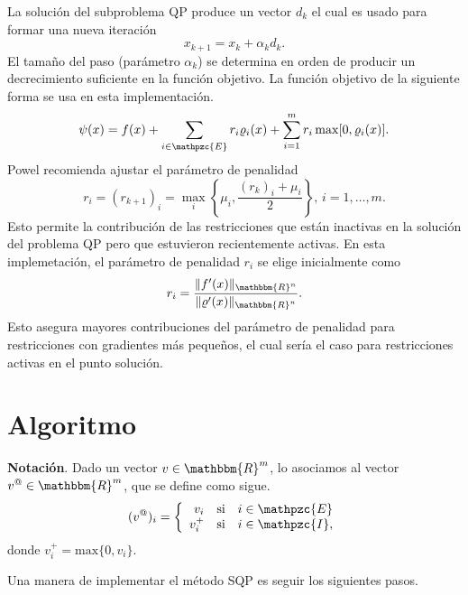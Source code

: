 \documentclass[a4paper,10pt]{book}
\newcommand{\R}{\mathbbm{R}}
\newcommand{\Rn}{\R^n}
\newcommand{\cI}{\mathpzc{I}}
\newcommand{\cE}{\mathpzc{E}}
\begin{document}
La solución del subproblema QP produce un vector $d_k$ el cual es usado para formar una nueva iteración $$x_{k+1}=x_k+\alpha_kd_k.$$
El tamaño del paso (parámetro $\alpha_k$) se determina en orden de producir un decrecimiento suficiente en la función objetivo. La función objetivo de la siguiente forma se usa en esta implementación. $$\psi(x)=f(x)+\sum_{i\in\cE}r_i\varrho_i(x)+\sum_{i=1}^mr_i\mathop{\mathrm{max}}[0,\varrho_i(x)].$$
Powel recomienda ajustar el parámetro de penalidad $$r_i=(r_{k+1})_i=\mathop{\mathrm{max}}_i\left\{\mu_i,\frac{(r_k)_i+\mu_i}{2}\right\},\, i=1,\ldots,m.$$
Esto permite la contribución de las restricciones que están inactivas en la solución del problema QP pero que estuvieron recientemente activas. En esta implemetación, el parámetro de penalidad $r_i$ se elige inicialmente como $$r_i=\frac{\|f'(x)\|_{\Rn}}{\|\varrho'(x)\|_{\Rn}}.$$
Esto asegura mayores contribuciones del parámetro de penalidad para restricciones con gradientes más pequeños, el cual sería el caso para restricciones activas en el punto solución.

\section{Algoritmo}

\textbf{Notación}. Dado un vector $v\in\R^m$, lo asociamos al vector $v^@\in\R^m$, que se define como sigue.
\[(v^@)_i=
\left\{\begin{array}{rcl}
v_i &\mbox{si}& i\in \cE\\
v_i^+&\mbox{si}& i\in \cI,
\end{array}\right.
\]
donde $v_i^+=\mathrm{max}\{0,v_i\}$.


Una manera de implementar el método SQP es seguir los siguientes pasos.
 
\end{document}
